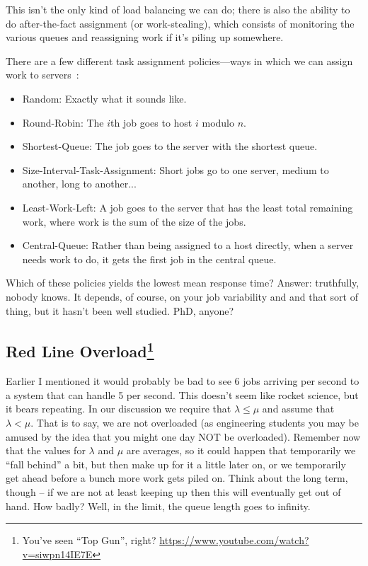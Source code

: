 This isn't the only kind of load balancing we can do; there is also the ability to do after-the-fact assignment (or work-stealing), which consists of monitoring the various queues and reassigning work if it's piling up somewhere.

There are a few different task assignment policies---ways in which we can assign work to servers~\cite{pmd}:

\begin{itemize}
	\item Random: Exactly what it sounds like.
	\item Round-Robin: The $i$th job goes to host $i$ modulo $n$.
	\item Shortest-Queue: The job goes to the server with the shortest queue.
	\item Size-Interval-Task-Assignment: Short jobs go to one server, medium to another, long to another...
	\item Least-Work-Left: A job goes to the server that has the least total remaining work, where work is the sum of the size of the jobs.
	\item Central-Queue: Rather than being assigned to a host directly, when a server needs work to do, it gets the first job in the central queue.
\end{itemize}

Which of these policies yields the lowest mean response time? Answer: truthfully, nobody knows. It depends, of course, on your job variability and and that sort of thing, but it hasn't been well studied. PhD, anyone?

\subsection*{Red Line Overload\footnote{You've seen ``Top Gun'', right? \url{https://www.youtube.com/watch?v=siwpn14IE7E}}}

Earlier I mentioned it would probably be bad to see 6 jobs arriving per second to a system that can handle 5 per second. This doesn't seem like rocket science, but it bears repeating. In our discussion we require that $\lambda \leq \mu$ and assume that $\lambda < \mu$. That is to say, we are not overloaded (as engineering students you may be amused by the idea that you might one day NOT be overloaded). Remember now that the values for $\lambda$ and $\mu$ are averages, so it could happen that temporarily we ``fall behind'' a bit, but then make up for it a little later on, or we temporarily get ahead before a bunch more work gets piled on. Think about the long term, though -- if we are not at least keeping up then this will eventually get out of hand. How badly? Well, in the limit, the queue length goes to infinity.

